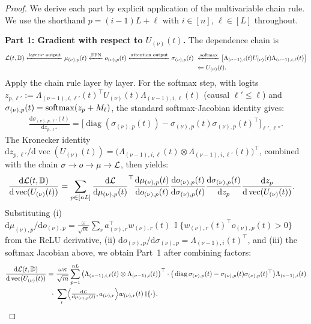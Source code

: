 \documentclass[11pt]{article}
\theoremstyle{plain}
\renewcommand{\d}{\mathrm{d}}
\DeclareMathOperator{\I}{\mathbb{I}}
\DeclareMathOperator{\diag}{diag}
\DeclareMathOperator{\vect}{vec}
\begin{document}
\begin{proof}
    We derive each part by explicit application of the multivariable chain rule. We use the shorthand $p = (i-1)L+\ell$ with $i \in [n]$, $\ell \in [L]$ throughout.

    {\bf Part 1: Gradient with respect to $U_{(\nu)}(t)$.} The dependence chain is
    \begin{align*}
        {\cal L}(t,\mathbb{D}) \xleftarrow{\text{layer-$\nu$ output}} \mu_{(\nu),p}(t) \xleftarrow{\text{FFN}} o_{(\nu),p}(t) \xleftarrow{\text{attention output}} \sigma_{(\nu),p}(t) & ~ \xleftarrow{\text{softmax}}  \big[\Lambda_{(\nu-1),i}(t) U_{(\nu)}(t) \Lambda_{(\nu-1),i,\ell}(t)\big] \\
        & ~ \xleftarrow{} U_{(\nu)}(t).
    \end{align*}
    Apply the chain rule layer by layer. For the softmax step, with logits $z_{p,\ell'} := \Lambda_{(\nu-1),i,\ell'}(t)^\top U_{(\nu)}(t) \Lambda_{(\nu-1),i,\ell}(t)$ (causal $\ell'\le \ell$) and $\sigma_{(\nu),p}(t) = {\rm softmax}(z_p+M_{\ell})$, the standard softmax-Jacobian identity gives:
    \begin{align*}
        \frac{\d \sigma_{(\nu),p,\ell'}(t)}{\d z_{p,\ell''}} = \big[\diag(\sigma_{(\nu),p}(t)) - \sigma_{(\nu),p}(t)\sigma_{(\nu),p}(t)^\top\big]_{\ell',\ell''}.
    \end{align*}
    The Kronecker identity $\d z_{p,\ell'}/\d \vect(U_{(\nu)}(t)) = \big(\Lambda_{(\nu-1),i,\ell}(t) \otimes \Lambda_{(\nu-1),i,\ell'}(t)\big)^\top$, combined with the chain $\sigma\to o\to \mu \to {\cal L}$, then yields:
    \begin{align*}
        \frac{\d{\cal L}(t,\mathbb{D})}{\d \vect(U_{(\nu)}(t))}
        &= \sum_{p\in[nL]} \frac{\d {\cal L}}{\d \mu_{(\nu),p}(t)}^\top\frac{\d \mu_{(\nu),p}(t)}{\d o_{(\nu),p}(t)}\frac{\d o_{(\nu),p}(t)}{\d \sigma_{(\nu),p}(t)}\frac{\d \sigma_{(\nu),p}(t)}{\d z_p}\frac{\d z_p}{\d \vect(U_{(\nu)}(t))}.
    \end{align*}
    Substituting (i) $\d\mu_{(\nu),p}/\d o_{(\nu),p} = \frac{\omega}{\sqrt m}\sum_r a_{(\nu),r}^\top w_{(\nu),r}(t)\,\I\{w_{(\nu),r}(t)^\top o_{(\nu),p}(t)>0\}$ from the ReLU derivative, (ii) $\d o_{(\nu),p}/\d \sigma_{(\nu),p} = \Lambda_{(\nu-1),i}(t)^\top$, and (iii) the softmax Jacobian above, we obtain Part~1 after combining factors:
    \begin{align*}
        \frac{\d{\cal L}(t,\mathbb{D})}{\d\vect(U_{(\nu)}(t))} = &~ \frac{\omega\kappa}{\sqrt{m}}\sum_{p=1}^{nL}\big(\Lambda_{(\nu-1),i,\ell}(t)\otimes \Lambda_{(\nu-1),i}(t)\big)^\top \cdot\big(\diag\sigma_{(\nu),p}(t)-\sigma_{(\nu),p}(t)\sigma_{(\nu),p}(t)^\top\big)\Lambda_{(\nu-1),i}(t)\\
        \cdot &~ \sum_{r}\!\Big\langle\tfrac{\d{\cal L}}{\d\mu_{(\nu),p}(t)},a_{(\nu),r}\Big\rangle w_{(\nu),r}(t)\I\{\cdot\}.
    \end{align*}


\end{proof}
\end{document}
